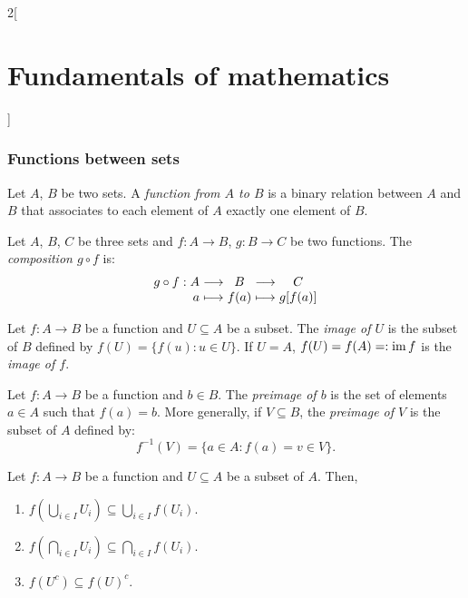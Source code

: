 \documentclass[../../../main.tex]{subfiles}
\begin{document}
\begin{multicols}{2}[\section{Fundamentals of mathematics}]
  \subsubsection{Functions between sets}
  \begin{definition}
    Let $A$, $B$ be two sets. A \textit{function from $A$ to $B$} is a binary relation between $A$ and $B$ that associates to each element of $A$ exactly one element of $B$.
  \end{definition}
  \begin{definition}
    Let $A$, $B$, $C$ be three sets and $f:A\rightarrow B$, $g:B\rightarrow C$ be two functions. The \textit{composition $g\circ f$} is:
    $$\begin{array}{r@{\hspace{0.5\tabcolsep}}c@{\hspace{0.5\tabcolsep}}c@{\hspace{0.5\tabcolsep}}c@{\hspace{0.5\tabcolsep}}c}
        g\circ f:A & \longrightarrow & B    & \longrightarrow & C       \\
        a          & \longmapsto     & f(a) & \longmapsto     & g[f(a)]
      \end{array}$$
  \end{definition}
  \begin{definition}
    Let $f:A\rightarrow B$ be a function and $U\subseteq A$ be a subset. The \textit{image of $U$} is the subset of $B$ defined by $f(U)=\{f(u): u\in U\}$. If $U=A$, $f(U)=f(A)=:\operatorname{im} f$ is the \textit{image of $f$}.
  \end{definition}
  \begin{definition}
    Let $f:A\rightarrow B$ be a function and $b\in B$. The \textit{preimage of $b$} is the set of elements $a\in A$ such that $f(a)=b$. More generally, if $V\subseteq B$, the \textit{preimage of $V$} is the subset of $A$ defined by: $$f^{-1}(V)=\{a\in A: f(a)=v\in V\}.$$
  \end{definition}
  \begin{prop}
    Let $f:A\rightarrow B$ be a function and $U\subseteq A$ be a subset of $A$. Then,
    \begin{enumerate}
      \item $f\left(\bigcup_{i\in I}U_i\right)\subseteq\bigcup_{i\in I}f(U_i)$.
      \item $f\left(\bigcap_{i\in I}U_i\right)\subseteq\bigcap_{i\in I}f(U_i)$.
      \item $f(U^c)\subseteq f(U)^c$.
    \end{enumerate}

\end{prop}
\end{multicols}
\end{document}
